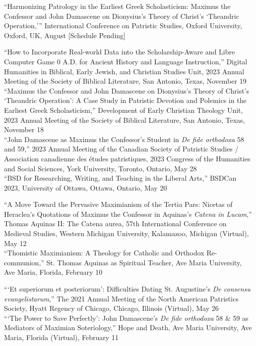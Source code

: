 \documentclass[letterpaper,12pt]{article}
\newcommand{\years}[1]{%
  {\reversemarginpar\strut\marginnote{{\small#1}}}%
}
\begin{document}
{{{{{{{\years{2024}%
%
``Harmonizing Patrology in the Earliest Greek Scholasticism: Maximus the Confessor and John Damascene on Dionysius's Theory of Christ's `Theandric Operation,''' International Conference on Patristic Studies, Oxford University, Oxford, UK, August [Schedule Pending] \\ [.3cm]
%
\years{2023}%
%
``How to Incorporate Real-world Data into the Scholarship-Aware and Libre Computer Game 0 A.D. for Ancient History and Language Instruction,'' Digital Humanities in Biblical, Early Jewish, and Christian Studies Unit, 2023 Annual Meeting of the Society of Biblical Literature, San Antonio, Texas, November 19  \\ [.3cm]
%
``Maximus the Confessor and John Damascene on Dionysius's Theory of Christ's `Theandric Operation': A Case Study in Patristic Devotion and Polemics in the Earliest Greek Scholasticism,'' Development of Early Christian Theology Unit, 2023 Annual Meeting of the Society of Biblical Literature, San Antonio, Texas, November 18  \\ [.3cm]
%
``John Damascene as Maximus the Confessor's Student in \emph{De fide orthodoxa} 58 and 59,'' 2023 Annual Meeting of the Canadian Society of Patristic Studies / Association canadienne des études patristiques, 2023 Congress of the Humanities and Social Sciences, York University, Toronto, Ontario, May 28  \\ [.3cm]
%
``BSD for Researching, Writing, and Teaching in the Liberal Arts,'' BSDCan 2023, University of Ottawa, Ottawa, Ontario, May 20  \\ [.3cm]
%
\years{2022}%
%
``A Move Toward the Pervasive Maximianism of the Tertia Pars: Nicetas of Heraclea's Quotations of Maximus the Confessor in Aquinas's \emph{Catena in Lucam},'' Thomas Aquinas II: The Catena aurea, 57th International Conference on Medieval Studies, Western Michigan University, Kalamazoo, Michigan (Virtual), May 12 \\ [.3cm]
%
``Thomistic Maximianism: A Theology for Catholic and Orthodox Re-communion,'' St. Thomas Aquinas as Spiritual Teacher, Ave Maria University, Ave Maria, Florida, February 10 \\ [.3cm]
%
\years{2021}%
%
```Et superiorum et posteriorum': Difficulties Dating St. Augustine's \emph{De consensu evangelistarum},'' The 2021 Annual Meeting of the North American Patristics Society, Hyatt Regency of Chicago, Chicago, Illinois (Virtual), May 26 \\ [.3cm]
%
```The Power to Save Perfectly': John Damascene's \emph{De fide orthodoxa} 58 \& 59 as Mediators of Maximian Soteriology,'' Hope and Death, Ave Maria University, Ave Maria, Florida (Virtual), February 11 \\ [.3cm]
}}}}}}}
\end{document}
